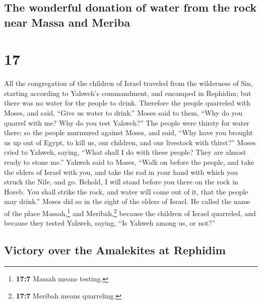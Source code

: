 \begin{paracol}{2}
\switchcolumn
\begin{otherlanguage}{english}

\hypertarget{the-wonderful-donation-of-water-from-the-rock-near-massa-and-meriba}{%
\subsection{The wonderful donation of water from the rock near Massa and
Meriba}\label{the-wonderful-donation-of-water-from-the-rock-near-massa-and-meriba}}

\hypertarget{section-33}{%
\section{17}\label{section-33}}

 All the congregation of the children of Israel traveled
from the wilderness of Sin, starting according to Yahweh's commandment,
and encamped in Rephidim; but there was no water for the people to
drink.  Therefore the people quarreled with Moses, and
said, ``Give us water to drink.'' Moses said to them, ``Why do you
quarrel with me? Why do you test Yahweh?''  The people
were thirsty for water there; so the people murmured against Moses, and
said, ``Why have you brought us up out of Egypt, to kill us, our
children, and our livestock with thirst?''  Moses cried to
Yahweh, saying, ``What shall I do with these people? They are almost
ready to stone me.''  Yahweh said to Moses, ``Walk on
before the people, and take the elders of Israel with you, and take the
rod in your hand with which you struck the Nile, and go. 
Behold, I will stand before you there on the rock in Horeb. You shall
strike the rock, and water will come out of it, that the people may
drink.'' Moses did so in the sight of the elders of Israel.
 He called the name of the place Massah,\footnote{\textbf{17:7}
  Massah means testing.} and Meribah,\footnote{\textbf{17:7} Meribah
  means quarreling.} because the children of Israel quarreled, and
because they tested Yahweh, saying, ``Is Yahweh among us, or not?''

\hypertarget{victory-over-the-amalekites-at-rephidim}{%
\subsection{Victory over the Amalekites at
Rephidim}\label{victory-over-the-amalekites-at-rephidim}}


\end{otherlanguage}
\end{paracol}

